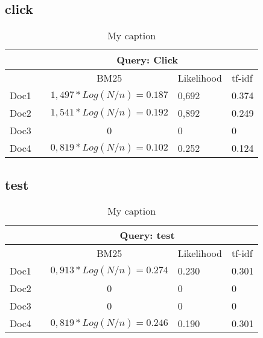 \documentclass{scrartcl}
\begin{document}
\subsection{click }

\begin{table}[]
\centering
\caption{My caption}
\label{my-label}
\begin{tabular}{|l|c|c|l|l|l|l|}
\hline
     & \multicolumn{6}{c|}{Query: Click}                                                           \\ \hline
     &  & BM25                     & \multicolumn{2}{l|}{Likelihood} & \multicolumn{2}{l|}{tf-idf} \\ \hline
Doc1 &  & $1,497* Log(N/n) = 0.187$  & \multicolumn{2}{l|}{0,692}      & \multicolumn{2}{l|}{0.374}  \\ \hline
Doc2 &  & $1,541* Log(N/n) = 0.192$  & \multicolumn{2}{l|}{0,892}      & \multicolumn{2}{l|}{0.249}  \\ \hline
Doc3 &  & 0                        & \multicolumn{2}{l|}{0}          & \multicolumn{2}{l|}{0}      \\ \hline
Doc4 &  & $0,819 *Log(N/n) = 0.102$ & \multicolumn{2}{l|}{0.252}      & \multicolumn{2}{l|}{0.124}  \\ \hline
\end{tabular}
\end{table}

\subsection{test}

\begin{table}[]
\centering
\caption{My caption}
\label{my-label}
\begin{tabular}{|l|c|c|l|l|l|l|}
\hline
     & \multicolumn{6}{c|}{Query: test}                                                            \\ \hline
     &  & BM25                     & \multicolumn{2}{l|}{Likelihood} & \multicolumn{2}{l|}{tf-idf} \\ \hline
Doc1 &  & $0,913* Log(N/n) = 0.274$  & \multicolumn{2}{l|}{0.230}      & \multicolumn{2}{l|}{0.301}  \\ \hline
Doc2 &  & 0                        & \multicolumn{2}{l|}{0}          & \multicolumn{2}{l|}{0}      \\ \hline
Doc3 &  & 0                        & \multicolumn{2}{l|}{0}          & \multicolumn{2}{l|}{0}      \\ \hline
Doc4 &  & $0,819 * Log(N/n) = 0.246$ & \multicolumn{2}{l|}{0.190}      & \multicolumn{2}{l|}{0.301}  \\ \hline
\end{tabular}
\end{table}
\end{document}

